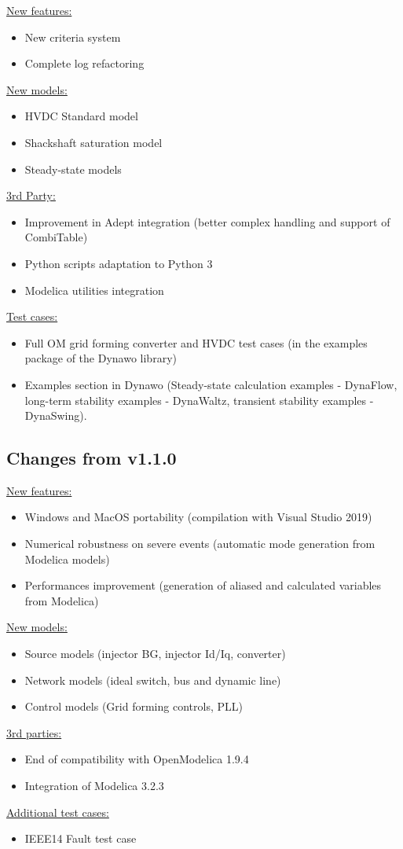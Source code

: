 \documentclass[a4paper, 12pt]{report}
\begin{document}
\underline{New features:}
\begin{itemize}
\item New criteria system
\item Complete log refactoring
\end{itemize}

\underline{New models:}
\begin{itemize}
\item HVDC Standard model
\item Shackshaft saturation model
\item Steady-state models
\end{itemize}

\underline{3rd Party:}
\begin{itemize}
\item Improvement in Adept integration (better complex handling and support of CombiTable)
\item Python scripts adaptation to Python 3
\item Modelica utilities integration
\end{itemize}

\underline{Test cases:}
\begin{itemize}
\item Full OM grid forming converter and HVDC test cases (in the examples package of the Dynawo library)
\item Examples section in Dynawo (Steady-state calculation examples - DynaFlow, long-term stability examples - DynaWaltz, transient stability examples - DynaSwing).
\end{itemize}

\subsection{Changes from v1.1.0}

\underline{New features:}
\begin{itemize}
\item Windows and MacOS portability (compilation with Visual Studio 2019)
\item Numerical robustness on severe events (automatic mode generation from Modelica models)
\item Performances improvement (generation of aliased and calculated variables from Modelica)
\end{itemize}

\underline{New models:}
\begin{itemize}
\item Source models (injector BG, injector Id/Iq, converter)
\item Network models (ideal switch, bus and dynamic line)
\item Control models (Grid forming controls, PLL)
\end{itemize}

\underline{3rd parties:}
\begin{itemize}
\item End of compatibility with OpenModelica 1.9.4
\item Integration of Modelica 3.2.3
\end{itemize}

\underline{Additional test cases:}
\begin{itemize}
\item IEEE14 Fault test case
\end{itemize}
\end{document}
